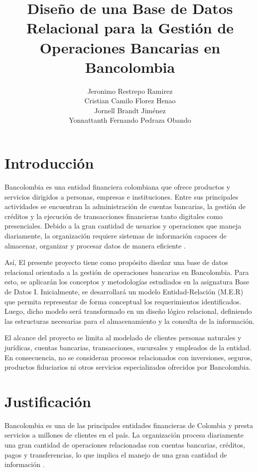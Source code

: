\documentclass[stu,12pt,floatsintext]{apa7}
\title{Diseño de una Base de Datos Relacional para la Gestión de Operaciones Bancarias en Bancolombia}
\author{Jeronimo Restrepo Ramirez \\
Cristian Camilo Florez Henao \\
Jornell Brandt Jiménez\\
Yonnattanth Fernando Pedraza Obando
}
\affiliation{Universidad Nacional de Colombia}
\begin{document}
\maketitle 

\section{Introducción} 

Bancolombia es una entidad financiera colombiana que ofrece productos y servicios dirigidos a personas, empresas e instituciones. Entre sus principales actividades se encuentran la administración de cuentas bancarias, la gestión de créditos y la ejecución de transacciones financieras tanto digitales como presenciales. Debido a la gran cantidad de usuarios y operaciones que maneja diariamente, la organización requiere sistemas de información capaces de almacenar, organizar y procesar datos de manera eficiente \parencite{GrupoBancolombia2024}.

Así, El presente proyecto tiene como propósito diseñar una base de datos relacional orientada a la gestión de operaciones bancarias en Bancolombia. Para esto, se aplicarán los conceptos y metodologías estudiados en la asignatura Base de Datos I. Inicialmente, se desarrollará un modelo Entidad-Relación (M.E.R) que permita representar de forma conceptual los requerimientos identificados. Luego, dicho modelo será transformado en un diseño lógico relacional, definiendo las estructuras necesarias para el almacenamiento y la consulta de la información.

El alcance del proyecto se limita al modelado de clientes personas naturales y jurídicas, cuentas bancarias, transacciones, sucursales y empleados de la entidad. En consecuencia, no se consideran procesos relacionados con inversiones, seguros, productos fiduciarios ni otros servicios especializados ofrecidos por Bancolombia.

\section{Justificación}

Bancolombia es una de las principales entidades financieras de Colombia y presta servicios a millones de clientes en el país. La organización procesa diariamente una gran cantidad de operaciones relacionadas con cuentas bancarias, créditos, pagos y transferencias, lo que implica el manejo de una gran cantidad de información \parencite{BancolombiaResultados2024}.
\end{document}
